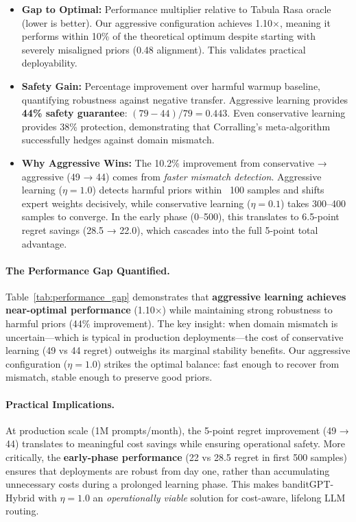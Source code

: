\begin{table}[t]
\begin{itemize}[leftmargin=*,nosep]
\item \textbf{Gap to Optimal:} Performance multiplier relative to Tabula Rasa oracle (lower is better). Our aggressive configuration achieves 1.10$\times$, meaning it performs within 10\% of the theoretical optimum despite starting with severely misaligned priors (0.48 alignment). This validates practical deployability.

\item \textbf{Safety Gain:} Percentage improvement over harmful warmup baseline, quantifying robustness against negative transfer. Aggressive learning provides \textbf{44\% safety guarantee}: $(79-44)/79 = 0.443$. Even conservative learning provides 38\% protection, demonstrating that Corralling's meta-algorithm successfully hedges against domain mismatch.

\item \textbf{Why Aggressive Wins:} The 10.2\% improvement from conservative → aggressive (49 → 44) comes from \emph{faster mismatch detection}. Aggressive learning ($\eta=1.0$) detects harmful priors within ~100 samples and shifts expert weights decisively, while conservative learning ($\eta=0.1$) takes 300--400 samples to converge. In the early phase (0--500), this translates to 6.5-point regret savings (28.5 → 22.0), which cascades into the full 5-point total advantage.
\end{itemize}

\vspace{0.5em}
\paragraph{The Performance Gap Quantified.}
Table~\ref{tab:performance_gap} demonstrates that \textbf{aggressive learning achieves near-optimal performance} (1.10$\times$) while maintaining strong robustness to harmful priors (44\% improvement). The key insight: when domain mismatch is uncertain—which is typical in production deployments—the cost of conservative learning (49 vs 44 regret) outweighs its marginal stability benefits. Our aggressive configuration ($\eta=1.0$) strikes the optimal balance: fast enough to recover from mismatch, stable enough to preserve good priors.

\paragraph{Practical Implications.}
At production scale (1M prompts/month), the 5-point regret improvement (49 → 44) translates to meaningful cost savings while ensuring operational safety. More critically, the \textbf{early-phase performance} (22 vs 28.5 regret in first 500 samples) ensures that deployments are robust from day one, rather than accumulating unnecessary costs during a prolonged learning phase. This makes banditGPT-Hybrid with $\eta=1.0$ an \emph{operationally viable} solution for cost-aware, lifelong LLM routing.

\end{table}

